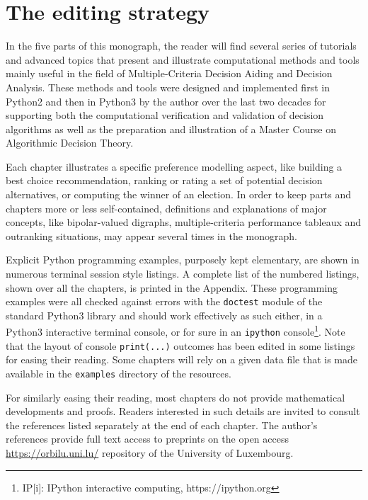 \label{sec:0}

{}
\section*{The editing strategy}
\label{sec:0.1}

In the five parts of this monograph, the reader will find  several series of tutorials and advanced topics that present and illustrate computational methods and tools mainly useful in the field of Multiple-Criteria Decision Aiding and Decision Analysis. These methods and tools were designed and implemented first in Python2 and then in Python3 by the author over the last two decades for supporting both the computational verification and validation of decision algorithms as well as the preparation and illustration of a Master Course on Algorithmic Decision Theory.

Each chapter illustrates a specific preference modelling aspect, like building a best choice recommendation, ranking or rating a set of potential decision alternatives, or computing the winner of an election. In order to keep parts and chapters more or less self-contained, definitions and explanations of major concepts, like bipolar-valued digraphs, multiple-criteria performance tableaux and outranking situations, may appear several times in the monograph.

Explicit Python programming examples, purposely kept elementary, are shown in numerous terminal session style listings. A complete list of the numbered listings, shown over all the chapters, is printed in the Appendix. These programming examples were all checked against errors with the \texttt{doctest} module of the standard Python3 library and should work effectively as such either, in a Python3 interactive terminal console, or for sure in an \texttt{ipython} console\footnote{IP[i]: IPython interactive computing, https://ipython.org}. Note that the layout of console \texttt{print(...)} outcomes has been edited in some listings for easing their reading. Some chapters will rely on a given data file that is made available in the \texttt{examples} directory of the \Digraph resources. 

For similarly easing their reading, most chapters do not provide mathematical developments and proofs. Readers interested in such details are invited to consult the references listed separately at the end of each chapter. The author's references provide full text access to preprints on the open access \href{https://orbilu.uni.lu/}{https://orbilu.uni.lu/} repository of the University of Luxembourg.

